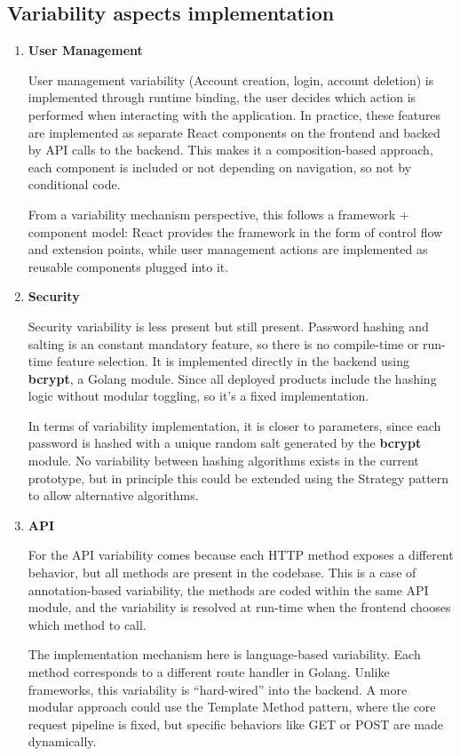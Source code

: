 \subsection{Variability aspects implementation}
\begin{enumerate}
    \item \textbf{User Management}

    User management variability (Account creation, login, account deletion) is implemented through runtime binding, the user decides which action is performed when interacting with the application. In practice, these features are implemented as separate React components on the frontend and backed by API calls to the backend. This makes it a composition-based approach, each component is included or not depending on navigation, so not by conditional code.
    
    From a variability mechanism perspective, this follows a framework + component model: React provides the framework in the form of control flow and extension points, while user management actions are implemented as reusable components plugged into it.
    
    \item \textbf{Security}
    
    Security variability is less present but still present. Password hashing and salting is an constant mandatory feature, so there is no compile-time or run-time feature selection. It is implemented directly in the backend using \textbf{bcrypt}, a Golang module. Since all deployed products include the hashing logic without modular toggling, so it's a fixed implementation.  
    
    In terms of variability implementation, it is closer to parameters, since each password is hashed with a unique random salt generated by the \textbf{bcrypt} module. No variability between hashing algorithms exists in the current prototype, but in principle this could be extended using the Strategy pattern to allow alternative algorithms.  

        
    \item \textbf{API}
    
    For the API variability comes because each HTTP method exposes a different behavior, but all methods are present in the codebase. This is a case of annotation-based variability, the methods are coded within the same API module, and the variability is resolved at run-time when the frontend chooses which method to call.
    
    The implementation mechanism here is language-based variability. Each method corresponds to a different route handler in Golang. Unlike frameworks, this variability is “hard-wired” into the backend. A more modular approach could use the Template Method pattern, where the core request pipeline is fixed, but specific behaviors like GET or POST are made dynamically.
    

\end{enumerate}

